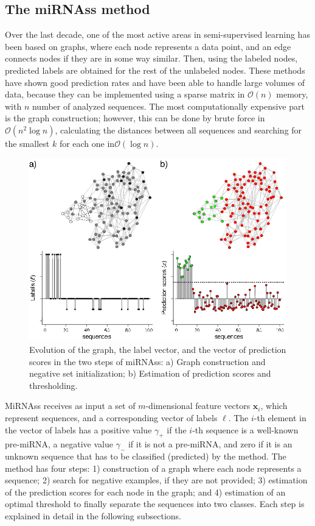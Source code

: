 \documentclass{article}
\newcommand*\Bell{\ensuremath{\boldsymbol\ell}}
\begin{document}
\subsection{The miRNAss method} \label{sec:miRNAss}
Over the last decade, one of the most active areas in semi-supervised learning has been based on graphs, where each node represents a data point, and an edge connects nodes if they are in some way similar. Then, using the labeled nodes, predicted labels are obtained for the rest of the unlabeled nodes. These methods have shown good prediction rates \citep{joachims2003transductive} and have been able to handle large volumes of data, because they can be implemented using a sparse matrix in $\mathcal{O}(n)$ memory, with $n$ number of analyzed sequences. The most computationally expensive part is the graph construction; however, this can be done by brute force in $\mathcal{O}(n^2 \log n)$, calculating the distances between all sequences and searching for the smallest $k$ for each one in$\mathcal{O}(\log n)$.
\begin{figure}[tpb]
	\centering
	\includegraphics[width=0.6\linewidth]{workflow.eps}
	\caption{Evolution of the graph, the label vector, and the vector of prediction scores in the two steps of miRNAss: a) Graph construction and negative set initialization; b) Estimation of prediction scores and thresholding.}
	\label{fig:workflow}
\end{figure}
MiRNAss receives as input a set of $m$-dimensional feature vectors $\mathbf{x}_{i}$, which represent sequences, and a corresponding vector of labels $\Bell$. The $i$-th element in the vector of labels has a positive value $\gamma_{+}$ if the $i$-th sequence is a well-known pre-miRNA, a negative value $\gamma_{-}$ if it is not a pre-miRNA, and zero if it is an unknown sequence that has to be classified (predicted) by the method. The method has four steps: 1) construction of a graph where each node represents a sequence; 2) search for negative examples, if they are not provided; 3) estimation of the prediction scores for each node in the graph; and 4) estimation of an optimal threshold to finally separate the sequences into two classes. Each step is explained in detail in the following subsections.
\end{document}
